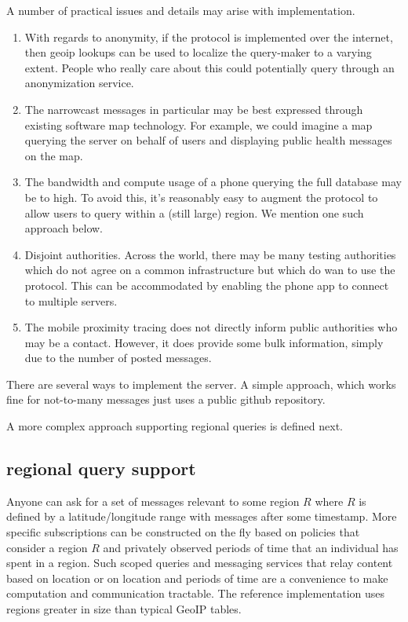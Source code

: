 \documentclass{article}
\begin{document}
A number of practical issues and details may arise with implementation.
\begin{enumerate}
    \item With regards to anonymity, if the protocol is implemented over the internet, then geoip lookups can be used to localize the query-maker to a varying extent.  People who really care about this could potentially query through an anonymization service.
    \item The narrowcast messages in particular may be best expressed through existing software map technology.   For example, we could imagine a map querying the server on behalf of users and displaying public health messages on the map.  
    \item The bandwidth and compute usage of a phone querying the full database may be to high.  To avoid this, it's reasonably easy to augment the protocol to allow users to query within a (still large) region.  We mention one such approach below.  
    \item Disjoint authorities.  Across the world, there may be many testing authorities which do not agree on a common infrastructure but which do wan to use the protocol.  This can be accommodated by enabling the phone app to connect to multiple servers. 
    \item The mobile proximity tracing does not directly inform public authorities who may be a contact.  However, it does provide some bulk information, simply due to the number of posted messages. 
\end{enumerate}

There are several ways to implement the server.  A simple approach, which works fine for not-to-many messages just uses a public github repository.

A more complex approach supporting regional queries is defined next.  

\subsection{regional query support}
Anyone can ask for a set of messages relevant to some region $R$ where $R$ is defined by a latitude/longitude range with messages after some timestamp.  More specific subscriptions can be constructed on the fly based on policies that consider a region $R$ and privately observed periods of time that an individual has spent in a region. Such scoped queries and messaging services that relay content based on location or on location and periods of time are a convenience to make computation and communication tractable.  The reference implementation uses regions greater in size than typical GeoIP tables.
\end{document}
